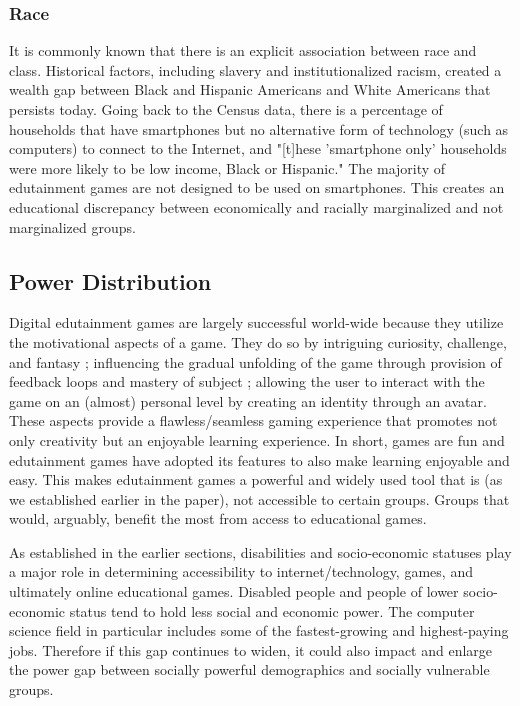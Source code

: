 \documentclass[10pt,twocolumn]{article}
\begin{document}
\subsubsection{Race}
    It is commonly known that there is an explicit association between race and class. Historical factors, including slavery and institutionalized racism, created a wealth gap between Black and Hispanic Americans and White Americans that persists today. Going back to the Census data, there is a percentage of households that have smartphones but no alternative form of technology (such as computers) to connect to the Internet, and "[t]hese 'smartphone only' households were more likely to be low income, Black or Hispanic." \cite{brown2019wealthy} The majority of edutainment games are not designed to be used on smartphones. This creates an educational discrepancy between economically and racially marginalized and not marginalized groups.




\subsection{Power Distribution}
    Digital edutainment games are largely successful world-wide because they utilize the motivational aspects of a game. They do so by intriguing curiosity, challenge, and fantasy \cite{malone1981makes}; influencing the gradual unfolding of the game through provision of feedback loops and mastery of subject \cite{qin2009measuring,}; allowing the user to interact with the game on an (almost) personal level by creating an identity through an avatar. \cite{blascovich2011infinite} These aspects provide a flawless/seamless gaming experience that promotes not only creativity but an enjoyable learning experience. In short, games are fun and edutainment games have adopted its features to also make learning enjoyable and easy. This makes edutainment games a powerful and widely used tool that is (as we established earlier in the paper), not accessible to certain groups. Groups that would, arguably, benefit the most from access to educational games.

    As established in the earlier sections, disabilities and socio-economic statuses play a major role in determining accessibility to internet/technology, games, and ultimately online educational games. Disabled people and people of lower socio-economic status tend to hold less social and economic power. The computer science field in particular includes some of the fastest-growing and highest-paying jobs. Therefore if this gap continues to widen, it could also impact and enlarge the power gap between socially powerful demographics and socially vulnerable groups. 
\end{document}
